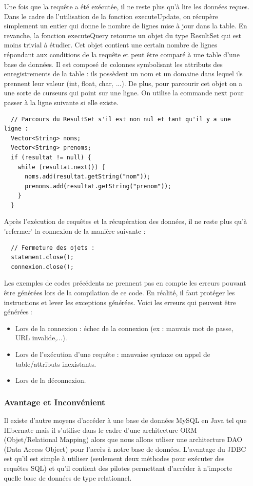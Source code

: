 Une fois que la requête a été exécutée, il ne reste plus qu'à lire les données reçues. Dans le cadre de l'utilisation de la fonction executeUpdate, on récupère simplement un entier qui donne le nombre de lignes mise à jour dans la table. En revanche, la fonction executeQuery retourne un objet du type ResultSet qui est moins trivial à étudier. Cet objet contient une certain nombre de lignes répondant aux conditions de la requête et peut être comparé à une table d'une base de données. Il est composé de colonnes symbolisant les attributs des enregistrements de la table : ils possèdent un nom et un domaine dans lequel ils prennent leur valeur (int, float, char, ...). De plus, pour parcourir cet objet on a une sorte de curseurs qui point sur une ligne. On utilise la commande next pour passer à la ligne suivante si elle existe.
\begin{lstlisting}  
  // Parcours du ResultSet s'il est non nul et tant qu'il y a une ligne :
  Vector<String> noms;
  Vector<String> prenoms;
  if (resultat != null) {
    while (resultat.next()) {
      noms.add(resultat.getString("nom"));
      prenoms.add(resultat.getString("prenom"));
    }
  }
\end{lstlisting}

Après l'exécution de requêtes et la récupération des données, il ne reste plus qu'à 'refermer' la connexion de la manière suivante :
\begin{lstlisting}
  // Fermeture des ojets :
  statement.close();
  connexion.close();
\end{lstlisting}

Les exemples de codes précédents ne prennent pas en compte les erreurs pouvant être générées lors de la compilation de ce code. En réalité, il faut protéger les instructions et lever les exceptions générées. Voici les erreurs qui peuvent être générées :
\begin{itemize}
 \item Lors de la connexion : échec de la connexion (ex : mauvais mot de passe, URL invalide,...).
 \item Lors de l'exécution d'une requête : mauvaise syntaxe ou appel de table/attributs inexistants.
 \item Lors de la déconnexion.
\end{itemize}

\subsubsection{Avantage et Inconvénient}
Il existe d'autre moyens d'accéder à une base de données MySQL en Java tel que Hibernate mais il s'utilise dans le cadre d'une architecture ORM (Objet/Relational Mapping) alors que nous allons utliser une architecture DAO (Data Access Object) pour l'accès à notre base de données. L'avantage du JDBC est qu'il est simple à utiliser (seulement deux méthodes pour exécuter des requêtes SQL) et qu'il contient des pilotes permettant d'accéder à n'importe quelle base de données de type relationnel.


